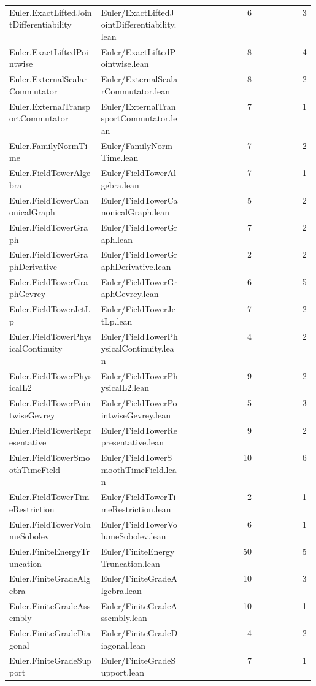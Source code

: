 \begin{longtable}{p{0.30\linewidth}p{0.28\linewidth}rr}
Euler.ExactLiftedJointDifferentiability & Euler/ExactLiftedJointDifferentiability.lean & 6 & 3\\
Euler.ExactLiftedPointwise & Euler/ExactLiftedPointwise.lean & 8 & 4\\
Euler.ExternalScalarCommutator & Euler/ExternalScalarCommutator.lean & 8 & 2\\
Euler.ExternalTransportCommutator & Euler/ExternalTransportCommutator.lean & 7 & 1\\
Euler.FamilyNormTime & Euler/FamilyNormTime.lean & 7 & 2\\
Euler.FieldTowerAlgebra & Euler/FieldTowerAlgebra.lean & 7 & 1\\
Euler.FieldTowerCanonicalGraph & Euler/FieldTowerCanonicalGraph.lean & 5 & 2\\
Euler.FieldTowerGraph & Euler/FieldTowerGraph.lean & 7 & 2\\
Euler.FieldTowerGraphDerivative & Euler/FieldTowerGraphDerivative.lean & 2 & 2\\
Euler.FieldTowerGraphGevrey & Euler/FieldTowerGraphGevrey.lean & 6 & 5\\
Euler.FieldTowerJetLp & Euler/FieldTowerJetLp.lean & 7 & 2\\
Euler.FieldTowerPhysicalContinuity & Euler/FieldTowerPhysicalContinuity.lean & 4 & 2\\
Euler.FieldTowerPhysicalL2 & Euler/FieldTowerPhysicalL2.lean & 9 & 2\\
Euler.FieldTowerPointwiseGevrey & Euler/FieldTowerPointwiseGevrey.lean & 5 & 3\\
Euler.FieldTowerRepresentative & Euler/FieldTowerRepresentative.lean & 9 & 2\\
Euler.FieldTowerSmoothTimeField & Euler/FieldTowerSmoothTimeField.lean & 10 & 6\\
Euler.FieldTowerTimeRestriction & Euler/FieldTowerTimeRestriction.lean & 2 & 1\\
Euler.FieldTowerVolumeSobolev & Euler/FieldTowerVolumeSobolev.lean & 6 & 1\\
Euler.FiniteEnergyTruncation & Euler/FiniteEnergyTruncation.lean & 50 & 5\\
Euler.FiniteGradeAlgebra & Euler/FiniteGradeAlgebra.lean & 10 & 3\\
Euler.FiniteGradeAssembly & Euler/FiniteGradeAssembly.lean & 10 & 1\\
Euler.FiniteGradeDiagonal & Euler/FiniteGradeDiagonal.lean & 4 & 2\\
Euler.FiniteGradeSupport & Euler/FiniteGradeSupport.lean & 7 & 1\\

\end{longtable}
